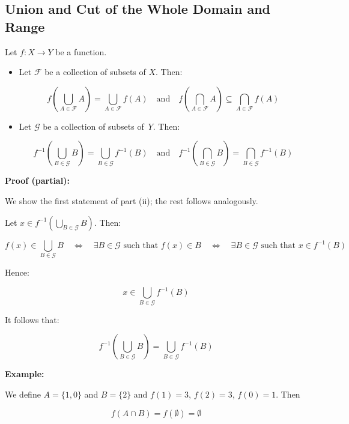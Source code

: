 \QED

\subsection{Union and Cut of the Whole Domain and Range}

Let \( f : X \to Y \) be a function.

\begin{itemize}

	\item Let \( \mathcal{F} \) be a collection of subsets of \(X\). Then:

   	      \[
		      f\left( \bigcup_{A \in \mathcal{F}} A \right) = \bigcup_{A \in \mathcal{F}} f(A)
		      \quad \text{and} \quad
		      f\left( \bigcap_{A \in \mathcal{F}} A \right) \subseteq \bigcap_{A \in \mathcal{F}} f(A)
	      \]

	\item Let \( \mathcal{G} \) be a collection of subsets of \emph{Y}. Then:

	      \[
		      f^{-1}\left( \bigcup_{B \in \mathcal{G}} B \right) = \bigcup_{B \in \mathcal{G}} f^{-1}(B)
		      \quad \text{and} \quad
		      f^{-1}\left( \bigcap_{B \in \mathcal{G}} B \right) = \bigcap_{B \in \mathcal{G}} f^{-1}(B)
	      \]

\end{itemize}

\textbf{Proof (partial):}

We show the first statement of part (ii); the rest follows analogously.

Let \( x \in f^{-1} \left( \bigcup_{B \in \mathcal{G}} B \right) \). Then:

\[
	f(x) \in \bigcup_{B \in \mathcal{G}} B
	\quad \Leftrightarrow \quad
	\exists B \in \mathcal{G} \text{ such that } f(x) \in B
	\quad \Leftrightarrow \quad
	\exists B \in \mathcal{G} \text{ such that } x \in f^{-1}(B)
\]

Hence:

\[
	x \in \bigcup_{B \in \mathcal{G}} f^{-1}(B)
\]

It follows that:

\[
	f^{-1} \left( \bigcup_{B \in \mathcal{G}} B \right) = \bigcup_{B \in \mathcal{G}} f^{-1}(B)
\]

\QED

\textbf{Example:}

We define \(A = \{1, 0\}\) and \(B = \{2\}\) and \(f(1) = 3\), \(f(2) = 3\), \(f(0) = 1\). Then 

\[
	f(A \cap B) = f( \emptyset) = \emptyset
\]

